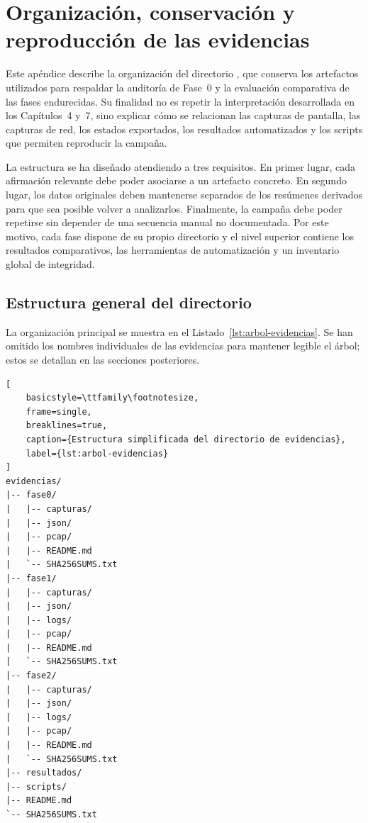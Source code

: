 
\chapter{Organización, conservación y reproducción de las evidencias}
\label{app:evidencias}

Este apéndice describe la organización del directorio , que conserva los artefactos utilizados para respaldar la auditoría de Fase~0 y la evaluación comparativa de las fases endurecidas. Su finalidad no es repetir la interpretación desarrollada en los Capítulos~4 y~7, sino explicar cómo se relacionan las capturas de pantalla, las capturas de red, los estados exportados, los resultados automatizados y los scripts que permiten reproducir la campaña.

La estructura se ha diseñado atendiendo a tres requisitos. En primer lugar, cada afirmación relevante debe poder asociarse a un artefacto concreto. En segundo lugar, los datos originales deben mantenerse separados de los resúmenes derivados para que sea posible volver a analizarlos. Finalmente, la campaña debe poder repetirse sin depender de una secuencia manual no documentada. Por este motivo, cada fase dispone de su propio directorio y el nivel superior contiene los resultados comparativos, las herramientas de automatización y un inventario global de integridad.

\section{Estructura general del directorio}

La organización principal se muestra en el Listado~\ref{lst:arbol-evidencias}. Se han omitido los nombres individuales de las evidencias para mantener legible el árbol; estos se detallan en las secciones posteriores.

\begin{lstlisting}[
    basicstyle=\ttfamily\footnotesize,
    frame=single,
    breaklines=true,
    caption={Estructura simplificada del directorio de evidencias},
    label={lst:arbol-evidencias}
]
evidencias/
|-- fase0/
|   |-- capturas/
|   |-- json/
|   |-- pcap/
|   |-- README.md
|   `-- SHA256SUMS.txt
|-- fase1/
|   |-- capturas/
|   |-- json/
|   |-- logs/
|   |-- pcap/
|   |-- README.md
|   `-- SHA256SUMS.txt
|-- fase2/
|   |-- capturas/
|   |-- json/
|   |-- logs/
|   |-- pcap/
|   |-- README.md
|   `-- SHA256SUMS.txt
|-- resultados/
|-- scripts/
|-- README.md
`-- SHA256SUMS.txt
\end{lstlisting}

